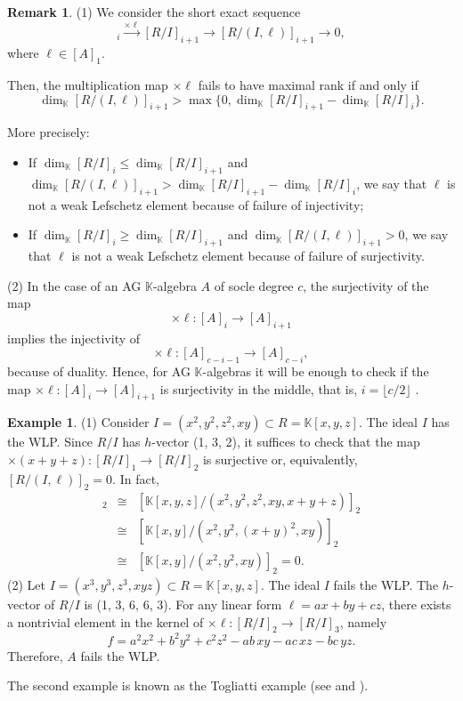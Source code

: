 \documentclass[12pt,twoside]{amsart}
\numberwithin{equation}{section} \hyphenation{semi-stable}
\newcommand{\K}{\mathbb{K}}
\theoremstyle{definition}
\newtheorem{remark}[theorem]{Remark}
\newtheorem{example}[theorem]{Example}
\begin{document}
\begin{remark} \label{rmk}  \noindent (1)  We consider the short exact sequence
    \begin{equation*}
    [R/I]_{i}\xrightarrow{\times\ell}[R/I]_{i+1}\rightarrow[R/(I,\ell)]_{i+1}\rightarrow 0,    
    \end{equation*}    
    where $\ell\in [A]_1.$
    
    Then, the multiplication map $\times\ell$ fails to have maximal rank if and only if
    \[
    \dim_\K[R/(I,\ell)]_{i+1} > \max\{0,\dim_\K[R/I]_{i+1}-\dim_\K[R/I]_{i}\}.
    \]


More precisely:
\begin{itemize}
    \item [(i)] If $\dim_\K[R/I]_{i}\leq \dim_\K[R/I]_{i+1}$ and $\dim_\K[R/(I,\ell)]_{i+1} > \dim_\K[R/I]_{i+1}-\dim_\K[R/I]_{i}$, we say that $\ell$ is not a weak Lefschetz element because of failure of injectivity;
    \item [(ii)] If $\dim_\K[R/I]_{i}\ge \dim_\K[R/I]_{i+1}$ and $\dim_\K[R/(I,\ell)]_{i+1} > 0$, we say that $\ell$ is not a weak Lefschetz element because of failure of surjectivity.
\end{itemize}
\end{remark}

\noindent \label{AG}(2) In the case of an AG $\K$-algebra \(A\) of socle degree \(c\), the surjectivity of the map 
\[
\times \ell : [A]_i \to [A]_{i+1}
\]
implies the injectivity of 
\[
\times \ell : [A]_{c-i-1} \to [A]_{c-i},
\]
because of duality. Hence, for AG $\K$-algebras it will be enough to check if
the map $\times \ell: [A]_i \longrightarrow [A]_{i+1}$ is surjectivity in the middle, that is, $i=\lfloor c / 2\rfloor$  \cite[Proposition 2.1]{MMN2}.

    \begin{example} (1) Consider $I = (x^2, y^2, z^2, xy) \subset R=\mathbb{K}[x, y, z]$. The ideal $I$ has the  WLP. Since $R/I$ has $h$-vector (1, 3, 2), it suffices to check that the map  $\times (x+y+z): [R/I]_1 \rightarrow [R/I]_2$ is surjective or, equivalently,  $[R/(I,\ell)]_2=0.$
In fact,
\begin{eqnarray*}
[R/(I,\ell)]_2
&\cong&
\left[\mathbb{K}[x,y,z]/(x^2,y^2,z^2,xy,x+y+z)\right]_2 \\
&\cong&
\left[\mathbb{K}[x,y]/(x^2,y^2,(x+y)^2,xy)\right]_2\\
&\cong&
[\mathbb{K}[x,y]/(x^2,y^2,xy)]_2 = 0.
\end{eqnarray*}
(2) Let $I = (x^3, y^3, z^3, xyz) \subset R=\mathbb{K}[x, y, z]$. The ideal $I$ fails the  WLP. The $h$-vector of $R/I$ is  (1, 3, 6, 6, 3). 
For any linear form $\ell = ax + by + cz$, there exists a nontrivial element in the kernel of $\times \ell:  [R/I]_2 \longrightarrow [R/I]_3$, namely
\[
f = a^2 x^2 + b^2 y^2 + c^2 z^2 - ab\, xy - ac\, xz - bc\, yz.
\]
Therefore, $A$ fails the WLP.
\end{example}
    The second example is known as the Togliatti example (see \cite{BK} and  \cite{MMRMO}).
\end{document}

